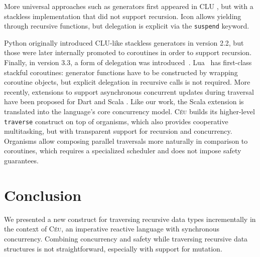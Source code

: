 \documentclass{sig-alternate}
\newcommand{\CEU}{\textsc{C\'{e}u}\xspace}
\newcommand{\code}[1] {{\small{\texttt{#1}}}}
\begin{document}

More universal approaches such as generators first appeared in CLU \cite{clu},
but with a stackless implementation that did not support recursion.
%
Icon \cite{icon} allows yielding through recursive functions, but delegation is 
explicit via the \code{suspend} keyword.
%

%
Python originally introduced CLU-like stackless generators in version 2.2,
but those were later internally promoted to coroutines in order to support
recursion. Finally, in version 3.3, a form of delegation was
introduced~\cite{peps}.
%
Lua~\cite{lua} has first-class stackful coroutines:
generator functions have to be constructed by wrapping coroutine objects, but 
explicit delegation in recursive calls is not required.
%
More recently, extensions to support asynchronous concurrent updates during
traversal have been proposed for Dart \cite{Meijer:2015:dart} and Scala \cite{haller2013ray}.
Like our work, the Scala extension is translated into the language's core concurrency model.
%
\CEU builds its higher-level \code{traverse} construct on top of organisms, 
which also provides cooperative multitasking, but with transparent support for 
recursion and concurrency.
Organisms allow composing parallel traversals more naturally in comparison to 
coroutines, which requires a specialized scheduler and does not impose safety 
guarantees.

\section{Conclusion}
\label{sec.conclusion}

We presented a new construct for traversing recursive data types
incrementally in the context of \CEU, an imperative reactive language with
synchronous concurrency.
Combining concurrency and safety while traversing recursive data structures is 
not straightforward, especially with support for mutation.
\end{document}
